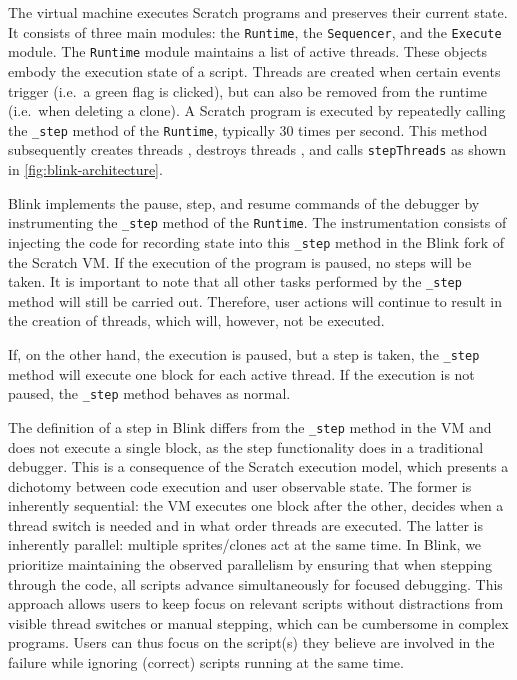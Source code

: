 \documentclass[../main]{subfiles}
\begin{document}
The virtual machine executes Scratch programs and preserves their current state.
It consists of three main modules: the \texttt{Runtime}, the \texttt{Sequencer}, and the \texttt{Execute} module.
The \texttt{Runtime} module maintains a list of active threads.
These objects embody the execution state of a script.
Threads are created when certain events trigger (i.e.\ a green flag is clicked), but can also be removed from the runtime (i.e.\ when deleting a clone).
A Scratch program is executed by repeatedly calling the \texttt{\_step} method of the \texttt{Runtime}, typically 30 times per second.
This method subsequently creates threads , destroys threads , and calls \texttt{stepThreads}  as shown in \cref{fig:blink-architecture}.

Blink implements the pause, step, and resume commands of the debugger by instrumenting the \texttt{\_step} method of the \texttt{Runtime}.
The instrumentation consists of injecting the code for recording state into this \texttt{\_step} method in the Blink fork of the Scratch VM\@.
If the execution of the program is paused, no steps will be taken.
It is important to note that all other tasks performed by the \texttt{\_step} method will still be carried out.
Therefore, user actions will continue to result in the creation of threads, which will, however, not be executed.

If, on the other hand, the execution is paused, but a step is taken, the \texttt{\_step} method will execute one block for each active thread.
If the execution is not paused, the \texttt{\_step} method behaves as normal.

The definition of a step in Blink differs from the \texttt{\_step} method in the VM and does not execute a single block, as the step functionality does in a traditional debugger.
This is a consequence of the Scratch execution model, which presents a dichotomy between code execution and user observable state.
The former is inherently sequential: the VM executes one block after the other, decides when a thread switch is needed and in what order threads are executed.
The latter is inherently parallel: multiple sprites/clones act at the same time.
In Blink, we prioritize maintaining the observed parallelism by ensuring that when stepping through the code, all scripts advance simultaneously for focused debugging.
This approach allows users to keep focus on relevant scripts without distractions from visible thread switches or manual stepping, which can be cumbersome in complex programs.
Users can thus focus on the script(s) they believe are involved in the failure while ignoring (correct) scripts running at the same time.
\end{document}
